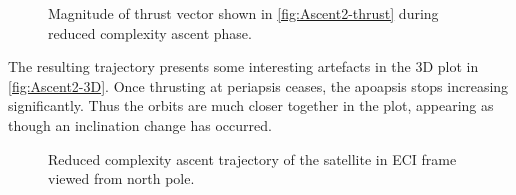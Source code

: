 \begin{figure}
\centering
\def\svgwidth{\figurewidth}

\caption{Magnitude of thrust vector shown in \autoref{fig:Ascent2-thrust} during reduced complexity ascent phase.} \label{fig:Ascent2-thrustM}
\end{figure}

The resulting trajectory presents some interesting artefacts in the 3D plot in \autoref{fig:Ascent2-3D}. Once thrusting at periapsis ceases, the apoapsis stops increasing significantly. Thus the orbits are much closer together in the plot, appearing as though an inclination change has occurred.

\begin{figure}
\centering
\def\svgwidth{\figurewidth}

\caption{Reduced complexity ascent trajectory of the satellite in ECI frame viewed from north pole.} \label{fig:Ascent2-3D}
\end{figure}

%
%
%
%
%
%
%
%
%
%
%

